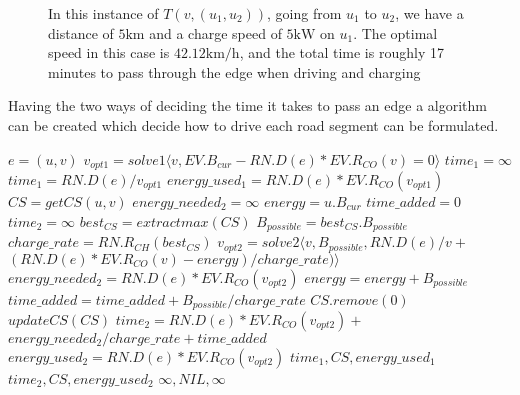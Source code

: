 \begin{figure}[!htb]
\label{fig:graph}
% 
\caption{In this instance of $T(v,(u_1, u_2))$, going from $u_1$ to $u_2$, we have a distance of $5 \si{\km}$ and a charge speed of $5 \si{\kW}$ on $u_1$. The optimal speed in this case is $42.12\si{\km\per\hour}$, and the total time is roughly 17 minutes to pass through the edge when driving and charging}
\end{figure}
Having the two ways of deciding the time it takes to pass an edge a algorithm can be created which decide how to drive each road segment can be formulated.   
\begin{algorithmic}
	\State $e = (u, v)$
	\State $v_{opt1} = solve1\langle v, EV.B_{cur}-RN.D(e)*EV.R_{CO}(v) = 0\rangle$
		\State $time_1 = \infty$
	\Else
		\State $time_1 = RN.D(e) / v_{opt1}$
		\State $energy\_used_{1} = RN.D(e)*EV.R_{CO}(v_{opt1})$
	\EndIf
		\State $CS = getCS(u, v)$ 
		\State $energy\_needed_{2} = \infty$
		\State $energy = u.B_{cur}$
		\State $time\_added = 0$
		\State $time_2 = \infty$
		\State $best_{CS} = extractmax(CS)$
		\State $B_{possible} = best_{CS}.B_{possible}$
		\State $charge\_rate = RN.R_{CH}(best_{CS})$
		\State $v_{opt2} = solve2 \langle v, B_{possible},  RN.D(e)/v + $
			\State $(RN.D(e)*EV.R_{CO}(v)-energy)/charge\_rate) \rangle$
		\State $energy\_needed_{2} = RN.D(e)*EV.R_{CO}(v_{opt2})$
		\State $energy = energy + B_{possible}$
			\State $time\_added = time\_added + B_{possible}/charge\_rate$
			\State $CS.remove(0)$
			\State $updateCS(CS)$
		\EndIf	
	\EndWhile
		\State $time_2 = RN.D(e)*EV.R_{CO}(v_{opt2}) + $
		\State $energy\_needed_{2}/charge\_rate + time\_added$
		\State $energy\_used_2 = RN.D(e)*EV.R_{CO}(v_{opt2})$
	\EndIf
		\State \Return $time_1, CS, energy\_used_1$
		\State \Return $time_2, CS, energy\_used_2$
	\Else
		\State \Return $\infty, NIL, \infty$
	\EndIf

\EndFunction
\end{algorithmic}\label{alg:fastest_path}
